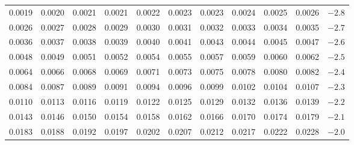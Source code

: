 \begin{table}[p]
\begin{center}
{\begin{tabular}{| rrrrr | rrrrr | c}
  \footnotesize{0.0019} & \footnotesize{0.0020} & \footnotesize{0.0021} & \footnotesize{0.0021} & \footnotesize{0.0022} & \footnotesize{0.0023} & \footnotesize{0.0023} & \footnotesize{0.0024} & \footnotesize{0.0025} & \footnotesize{0.0026} & $-2.8$ \\
  \footnotesize{0.0026} & \footnotesize{0.0027} & \footnotesize{0.0028} & \footnotesize{0.0029} & \footnotesize{0.0030} & \footnotesize{0.0031} & \footnotesize{0.0032} & \footnotesize{0.0033} & \footnotesize{0.0034} & \footnotesize{0.0035} & $-2.7$ \\
  \footnotesize{0.0036} & \footnotesize{0.0037} & \footnotesize{0.0038} & \footnotesize{0.0039} & \footnotesize{0.0040} & \footnotesize{0.0041} & \footnotesize{0.0043} & \footnotesize{0.0044} & \footnotesize{0.0045} & \footnotesize{0.0047} & $-2.6$ \\
  \footnotesize{0.0048} & \footnotesize{0.0049} & \footnotesize{0.0051} & \footnotesize{0.0052} & \footnotesize{0.0054} & \footnotesize{0.0055} & \footnotesize{0.0057} & \footnotesize{0.0059} & \footnotesize{0.0060} & \footnotesize{0.0062} & $-2.5$ \\
    \hline
  \footnotesize{0.0064} & \footnotesize{0.0066} & \footnotesize{0.0068} & \footnotesize{0.0069} & \footnotesize{0.0071} & \footnotesize{0.0073} & \footnotesize{0.0075} & \footnotesize{0.0078} & \footnotesize{0.0080} & \footnotesize{0.0082} & $-2.4$ \\
  \footnotesize{0.0084} & \footnotesize{0.0087} & \footnotesize{0.0089} & \footnotesize{0.0091} & \footnotesize{0.0094} & \footnotesize{0.0096} & \footnotesize{0.0099} & \footnotesize{0.0102} & \footnotesize{0.0104} & \footnotesize{0.0107} & $-2.3$ \\
  \footnotesize{0.0110} & \footnotesize{0.0113} & \footnotesize{0.0116} & \footnotesize{0.0119} & \footnotesize{0.0122} & \footnotesize{0.0125} & \footnotesize{0.0129} & \footnotesize{0.0132} & \footnotesize{0.0136} & \footnotesize{0.0139} & $-2.2$ \\
  \footnotesize{0.0143} & \footnotesize{0.0146} & \footnotesize{0.0150} & \footnotesize{0.0154} & \footnotesize{0.0158} & \footnotesize{0.0162} & \footnotesize{0.0166} & \footnotesize{0.0170} & \footnotesize{0.0174} & \footnotesize{0.0179} & $-2.1$ \\
  \footnotesize{0.0183} & \footnotesize{0.0188} & \footnotesize{0.0192} & \footnotesize{0.0197} & \footnotesize{0.0202} & \footnotesize{0.0207} & \footnotesize{0.0212} & \footnotesize{0.0217} & \footnotesize{0.0222} & \footnotesize{0.0228} & $-2.0$ \\

\end{tabular}}
\end{center}
\end{table}
